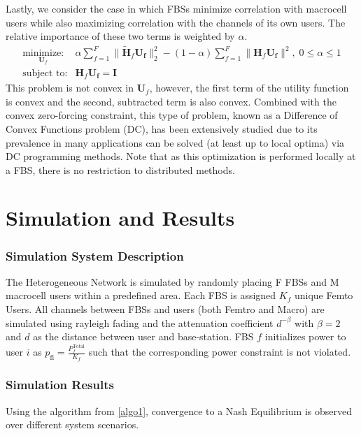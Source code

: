 \documentclass[12pt,a4paper]{report}
\begin{document}
\par
Lastly, we consider the case in which FBSs minimize correlation with macrocell users while also maximizing correlation with the channels of its own users. The relative importance of these two terms is weighted by $\alpha.$
    \begin{equation}
    \begin{array}{ll}
    \underset{\mathbf{U}_{f} }{\text{minimize:}}   & \alpha\sum^F_{f=1} \|\mathbf{\tilde{H}}_{f}  \mathbf{U_{f}}\|^2_2
    -
    (1-\alpha)\sum^F_{f=1} \|\mathbf{H}_{f}  \mathbf{U_{f}}\|^2, \; 0\leq \alpha \leq 1
    \\
    \mbox{subject to:} & \mathbf{H}_{f}  \mathbf{U_{f}} = \mathbf{I}
    \end{array}
    \label{e-opt-prob}
    \end{equation}
    This problem is not convex in $\mathbf{U}_{f}$, however, the first term of the utility function is convex and the second, subtracted term is also convex. Combined with the convex zero-forcing constraint, this type of problem, known as a Difference of Convex Functions problem (DC), has been extensively studied due to its prevalence in many applications can be solved (at least up to local optima) via DC programming methods. Note that as this optimization is performed locally at a FBS, there is no restriction to distributed methods.
     


\chapter{Simulation and Results}\label{numerical}
\subsection{Simulation System Description}
The Heterogeneous Network is simulated by randomly placing F FBSs and M macrocell users within a predefined area. Each FBS is assigned $K_{f}$ unique Femto Users. All channels between FBSs and users (both Femtro and Macro) are simulated using rayleigh fading and the attenuation coefficient $d^{- \beta}$ with $\beta =2$ and $d$ as the distance between user and base-station.
FBS $f$ initializes power to user $i$ as $p_{\mathrm{fi}} = \frac{{P_{f}^{\text{Total}}}}{K_{f}} $ such that the corresponding power constraint is not violated. 


\subsection{Simulation Results}
Using the algorithm from \ref{algo1}, convergence to a Nash Equilibrium is observed over different system scenarios. 
\end{document}
